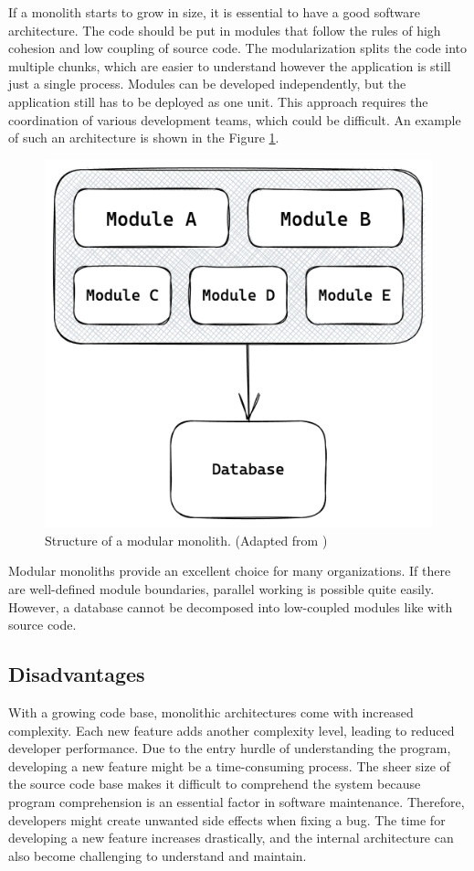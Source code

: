 \noindent If a monolith starts to grow in size, it is essential to have a good software architecture. The code should be put in modules that follow the rules of high cohesion and low coupling of source code. The modularization splits the code into multiple chunks, which are easier to understand however the application is still just a single process. Modules can be developed independently, but the application still has to be deployed as one unit. This approach requires the coordination of various development teams, which could be difficult. \cite[12-13]{book:2018:richardson:background:bff:microservices-patterns} \cite[12-13]{book:2019:newman:background:monolith:monolith-to-microservices} An example of such an architecture is shown in the Figure \ref{fig:background:monolith:module-monolith-sketch}.

\ifshowImages
\begin{figure}[H]
  \centering
  \includegraphics[width=0.3\linewidth]{images/background/monolith/modular-monolith-sketch.png}
  \caption{Structure of a modular monolith. (Adapted from \cite[13]{book:2019:newman:background:monolith:monolith-to-microservices})}\label{fig:background:monolith:module-monolith-sketch}
\end{figure}
\fi

\noindent Modular monoliths provide an excellent choice for many organizations. If there are well-defined module boundaries, parallel working is possible quite easily. However, a database cannot be decomposed into low-coupled modules like with source code. \cite[12-13]{book:2019:newman:background:monolith:monolith-to-microservices}

\subsection{Disadvantages}\label{subsection:background:software-monolith:disadvantages}

With a growing code base, monolithic architectures come with increased complexity. Each new feature adds another complexity level, leading to reduced developer performance. Due to the entry hurdle of understanding the program, developing a new feature might be a time-consuming process. The sheer size of the source code base makes it difficult to comprehend the system because program comprehension is an essential factor in software maintenance. \cite{article:1995:mayrhauser:background:monoliths:program-comprehension-during-software-maintenance-and-evolution} Therefore, developers might create unwanted side effects when fixing a bug. The time for developing a new feature increases drastically, and the internal architecture can also become challenging to understand and maintain. \cite[4-6]{book:2018:richardson:background:bff:microservices-patterns}

